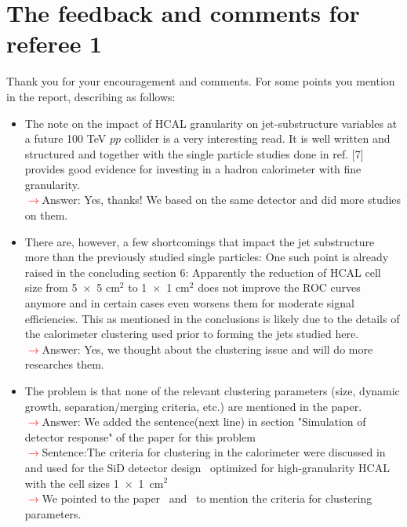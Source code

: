 \documentclass[final,1p,11pt]{elsarticle}
\begin{document}
\section{The feedback and comments for referee 1}
Thank you for your encouragement and comments. For some points you mention in the report, describing as follows:\\
\begin{itemize}
\item The note on the impact of HCAL granularity on jet-substructure variables at a future 100 TeV $pp$ collider is a very interesting read. It is well written and structured and together with the single particle studies done in ref. [7] provides good evidence for investing in a hadron calorimeter with fine granularity.\\
\textcolor{red}{$\rightarrow$}Answer: Yes, thanks! We based on the same detector and did more studies on them.
\item There are, however, a few shortcomings that impact the jet substructure more than the previously studied single particles: One such point is already raised in the concluding section 6: Apparently the reduction of HCAL cell size from 5~$\times$~5 cm$^2$ to 1~$\times$~1 cm$^2$ does not improve the ROC curves anymore and in certain cases even worsens them for moderate signal efficiencies. This as mentioned in the conclusions is likely due to the details of the calorimeter clustering used prior to forming the jets studied here.\\
 \textcolor{red}{$\rightarrow$}Answer: Yes, we thought about the clustering issue and will do more researches them.
\item The problem is that none of the relevant clustering parameters (size, dynamic growth, separation/merging criteria, etc.) are mentioned in the paper.\\
 \textcolor{red}{$\rightarrow$}Answer: We added the sentence(next line) in section "Simulation of detector response" of the paper for this problem\\ 
 \textcolor{red}{$\rightarrow$}Sentence:The criteria for clustering in the calorimeter were discussed in~\cite{THOMSON200925} and used for the SiD detector design~\cite{Behnke:2013lya} optimized for high-granularity HCAL with the cell sizes 1~$\times$~1~cm$^2$\\
 \textcolor{red}{$\rightarrow$}We pointed to the paper~\cite{THOMSON200925} and~\cite{Behnke:2013lya} to mention the criteria for clustering parameters.

\end{itemize}
\end{document}
